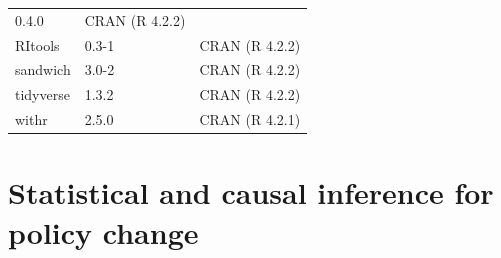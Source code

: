 \documentclass[
  12pt,
]{book}
\theoremstyle{definition}
\theoremstyle{definition}
\theoremstyle{definition}
\theoremstyle{remark}
\begin{document}
\begin{longtable}[]{@{}lll@{}}
\begin{minipage}[t]{0.08\columnwidth}
0.4.0\strut
\end{minipage} & \begin{minipage}[t]{0.69\columnwidth}\raggedright
CRAN (R 4.2.2)\strut
\end{minipage}\tabularnewline
\begin{minipage}[t]{0.14\columnwidth}\raggedright
RItools\strut
\end{minipage} & \begin{minipage}[t]{0.08\columnwidth}\raggedright
0.3-1\strut
\end{minipage} & \begin{minipage}[t]{0.69\columnwidth}\raggedright
CRAN (R 4.2.2)\strut
\end{minipage}\tabularnewline
\begin{minipage}[t]{0.14\columnwidth}\raggedright
sandwich\strut
\end{minipage} & \begin{minipage}[t]{0.08\columnwidth}\raggedright
3.0-2\strut
\end{minipage} & \begin{minipage}[t]{0.69\columnwidth}\raggedright
CRAN (R 4.2.2)\strut
\end{minipage}\tabularnewline
\begin{minipage}[t]{0.14\columnwidth}\raggedright
tidyverse\strut
\end{minipage} & \begin{minipage}[t]{0.08\columnwidth}\raggedright
1.3.2\strut
\end{minipage} & \begin{minipage}[t]{0.69\columnwidth}\raggedright
CRAN (R 4.2.2)\strut
\end{minipage}\tabularnewline
\begin{minipage}[t]{0.14\columnwidth}\raggedright
withr\strut
\end{minipage} & \begin{minipage}[t]{0.08\columnwidth}\raggedright
2.5.0\strut
\end{minipage} & \begin{minipage}[t]{0.69\columnwidth}\raggedright
CRAN (R 4.2.1)\strut
\end{minipage}\tabularnewline
\bottomrule
\end{longtable}

\hypertarget{statistical-and-causal-inference-for-policy-change}{%
\chapter{Statistical and causal inference for policy
change}\label{statistical-and-causal-inference-for-policy-change}}
\end{document}
